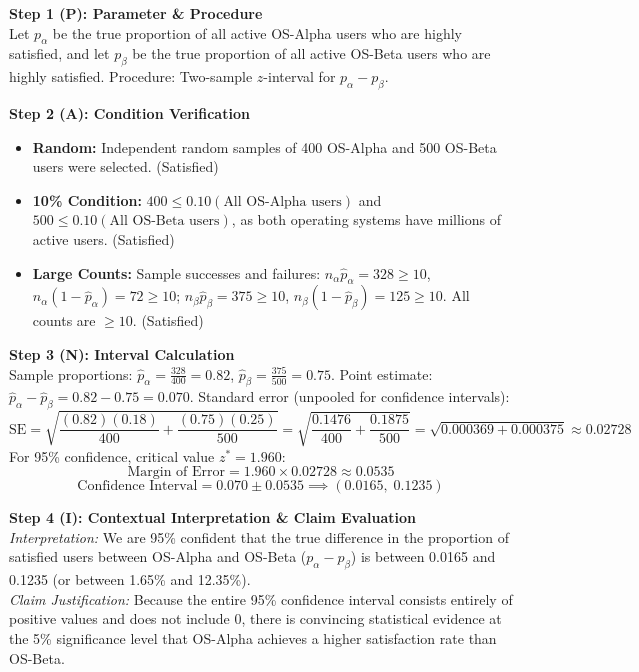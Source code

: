 \begin{frqrubricbox}
\textbf{Step 1 (P): Parameter \& Procedure}\\
Let $p_\alpha$ be the true proportion of all active OS-Alpha users who are highly satisfied, and let $p_\beta$ be the true proportion of all active OS-Beta users who are highly satisfied. Procedure: Two-sample $z$-interval for $p_\alpha - p_\beta$.

\textbf{Step 2 (A): Condition Verification}\\
\begin{itemize}
  \item \textbf{Random:} Independent random samples of 400 OS-Alpha and 500 OS-Beta users were selected. (Satisfied)
  \item \textbf{10\% Condition:} $400 \le 0.10(\text{All OS-Alpha users})$ and $500 \le 0.10(\text{All OS-Beta users})$, as both operating systems have millions of active users. (Satisfied)
  \item \textbf{Large Counts:} Sample successes and failures:
  $n_\alpha \hat{p}_\alpha = 328 \ge 10$, $n_\alpha(1 - \hat{p}_\alpha) = 72 \ge 10$;
  $n_\beta \hat{p}_\beta = 375 \ge 10$, $n_\beta(1 - \hat{p}_\beta) = 125 \ge 10$. All counts are $\ge 10$. (Satisfied)
\end{itemize}

\textbf{Step 3 (N): Interval Calculation}\\
Sample proportions: $\hat{p}_\alpha = \frac{328}{400} = 0.82$, $\hat{p}_\beta = \frac{375}{500} = 0.75$.
Point estimate: $\hat{p}_\alpha - \hat{p}_\beta = 0.82 - 0.75 = 0.070$.
Standard error (unpooled for confidence intervals):
\[ \text{SE} = \sqrt{\frac{(0.82)(0.18)}{400} + \frac{(0.75)(0.25)}{500}} = \sqrt{\frac{0.1476}{400} + \frac{0.1875}{500}} = \sqrt{0.000369 + 0.000375} \approx 0.02728 \]
For 95\% confidence, critical value $z^* = 1.960$:
\[ \text{Margin of Error} = 1.960 \times 0.02728 \approx 0.0535 \]
\[ \text{Confidence Interval} = 0.070 \pm 0.0535 \implies (0.0165, \; 0.1235) \]

\textbf{Step 4 (I): Contextual Interpretation \& Claim Evaluation}\\
\textit{Interpretation:} We are 95\% confident that the true difference in the proportion of satisfied users between OS-Alpha and OS-Beta ($p_\alpha - p_\beta$) is between 0.0165 and 0.1235 (or between 1.65\% and 12.35\%).\\
\textit{Claim Justification:} Because the entire 95\% confidence interval consists entirely of positive values and does not include 0, there is convincing statistical evidence at the 5\% significance level that OS-Alpha achieves a higher satisfaction rate than OS-Beta.


\end{frqrubricbox}
